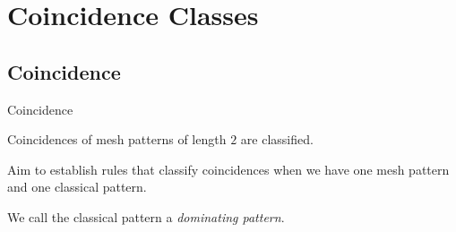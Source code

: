 \section{Coincidence Classes}
\label{sec:Coincidence Classes}
\subsection{Coincidence}
\label{sub:Coincidence}
\begin{frame}{Coincidence}
  \begin{block}{}
    Coincidences of mesh patterns of length \(2\) are classified.

    Aim to establish rules that classify coincidences when we
    have one mesh pattern and one classical pattern.

    We call the classical pattern a \emph{dominating pattern}.
  \end{block}
\end{frame}


